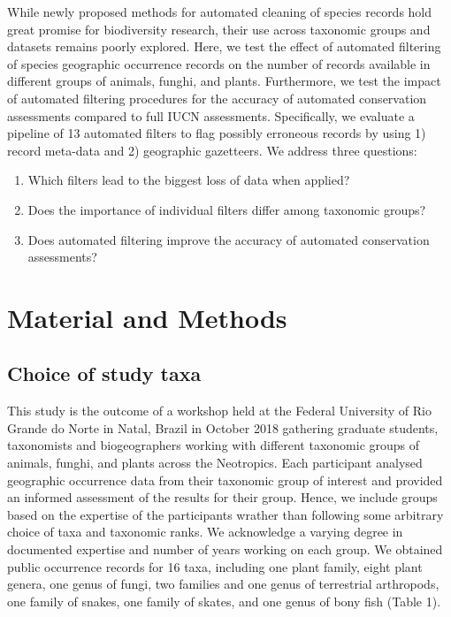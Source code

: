 \documentclass[
  12pt,
]{article}
\providecommand{\tightlist}{%
  \setlength{\itemsep}{0pt}\setlength{\parskip}{0pt}}
\begin{document}
While newly proposed methods for automated cleaning of species records hold great promise for biodiversity research, their use across taxonomic groups and datasets remains poorly explored. Here, we test the effect of automated filtering of species geographic occurrence records on the number of records available in different groups of animals, funghi, and plants. Furthermore, we test the impact of automated filtering procedures for the accuracy of automated conservation assessments compared to full IUCN assessments. Specifically, we evaluate a pipeline of 13 automated filters to flag possibly erroneous records by using 1) record meta-data and 2) geographic gazetteers. We address three questions:

\begin{enumerate}
\def\labelenumi{\arabic{enumi}.}
\tightlist
\item
  Which filters lead to the biggest loss of data when applied?
\item
  Does the importance of individual filters differ among taxonomic groups?
\item
  Does automated filtering improve the accuracy of automated conservation assessments?
\end{enumerate}

\hypertarget{material-and-methods}{%
\section{Material and Methods}\label{material-and-methods}}

\hypertarget{choice-of-study-taxa}{%
\subsection{Choice of study taxa}\label{choice-of-study-taxa}}

This study is the outcome of a workshop held at the Federal University of Rio Grande do Norte in Natal, Brazil in October 2018 gathering graduate students, taxonomists and biogeographers working with different taxonomic groups of animals, funghi, and plants across the Neotropics. Each participant analysed geographic occurrence data from their taxonomic group of interest and provided an informed assessment of the results for their group. Hence, we include groups based on the expertise of the participants wrather than following some arbitrary choice of taxa and taxonomic ranks. We acknowledge a varying degree in documented expertise and number of years working on each group. We obtained public occurrence records for 16 taxa, including one plant family, eight plant genera, one genus of fungi, two families and one genus of terrestrial arthropods, one family of snakes, one family of skates, and one genus of bony fish (Table 1).
\end{document}
